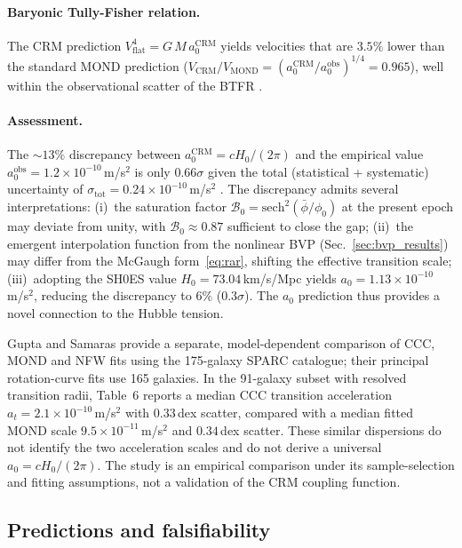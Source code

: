 \documentclass[aps,prd,twocolumn,superscriptaddress,nofootinbib]{revtex4-2}
\begin{document}
\paragraph{Baryonic Tully-Fisher relation.}
The CRM prediction $V_{\mathrm{flat}}^4 = G\,M\,a_0^{\mathrm{CRM}}$ yields velocities that are $3.5\%$ lower than the standard MOND prediction ($V_{\mathrm{CRM}}/V_{\mathrm{MOND}} = (a_0^{\mathrm{CRM}}/a_0^{\mathrm{obs}})^{1/4} = 0.965$), well within the observational scatter of the BTFR \cite{McGaugh2012}.

\paragraph{Assessment.}
The $\sim 13\%$ discrepancy between $a_0^{\mathrm{CRM}} = cH_0/(2\pi)$ and the empirical value $a_0^{\mathrm{obs}} = 1.2 \times 10^{-10}$\,m/s$^2$ is only $0.66\sigma$ given the total (statistical + systematic) uncertainty of $\sigma_{\mathrm{tot}} = 0.24 \times 10^{-10}$\,m/s$^2$ \cite{McGaugh2016}. The discrepancy admits several interpretations: (i)~the saturation factor $\mathcal{B}_0 = \mathrm{sech}^2(\bar{\phi}/\phi_0)$ at the present epoch may deviate from unity, with $\mathcal{B}_0 \approx 0.87$ sufficient to close the gap; (ii)~the emergent interpolation function from the nonlinear BVP (Sec.~\ref{sec:bvp_results}) may differ from the McGaugh form~\eqref{eq:rar}, shifting the effective transition scale; (iii)~adopting the SH0ES value $H_0 = 73.04$\,km/s/Mpc \cite{Riess2022} yields $a_0 = 1.13 \times 10^{-10}$\,m/s$^2$, reducing the discrepancy to $6\%$ ($0.3\sigma$). The $a_0$ prediction thus provides a novel connection to the Hubble tension.

Gupta and Samaras \cite{Gupta2026} provide a separate, model-dependent comparison of CCC, MOND and NFW fits using the 175-galaxy SPARC catalogue; their principal rotation-curve fits use 165 galaxies. In the 91-galaxy subset with resolved transition radii, Table~6 reports a median CCC transition acceleration $a_t=2.1\times10^{-10}$\,m/s$^2$ with $0.33$\,dex scatter, compared with a median fitted MOND scale $9.5\times10^{-11}$\,m/s$^2$ and $0.34$\,dex scatter. These similar dispersions do not identify the two acceleration scales and do not derive a universal $a_0=cH_0/(2\pi)$. The study is an empirical comparison under its sample-selection and fitting assumptions, not a validation of the CRM coupling function.

\subsection{Predictions and falsifiability}
\end{document}
